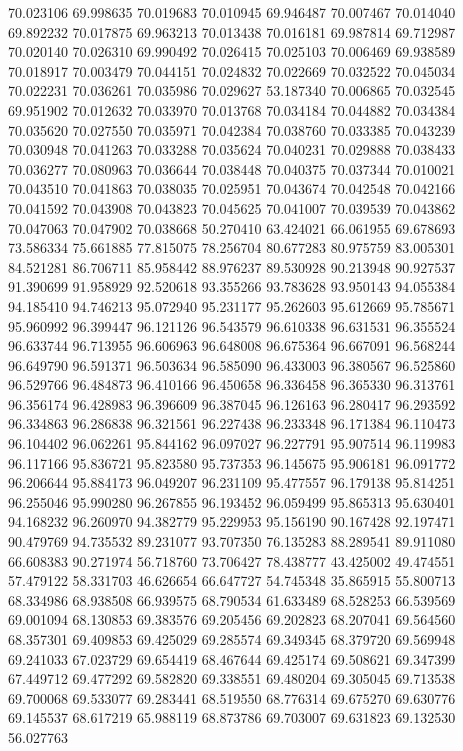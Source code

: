 70.023106
69.998635
70.019683
70.010945
69.946487
70.007467
70.014040
69.892232
70.017875
69.963213
70.013438
70.016181
69.987814
69.712987
70.020140
70.026310
69.990492
70.026415
70.025103
70.006469
69.938589
70.018917
70.003479
70.044151
70.024832
70.022669
70.032522
70.045034
70.022231
70.036261
70.035986
70.029627
53.187340
70.006865
70.032545
69.951902
70.012632
70.033970
70.013768
70.034184
70.044882
70.034384
70.035620
70.027550
70.035971
70.042384
70.038760
70.033385
70.043239
70.030948
70.041263
70.033288
70.035624
70.040231
70.029888
70.038433
70.036277
70.080963
70.036644
70.038448
70.040375
70.037344
70.010021
70.043510
70.041863
70.038035
70.025951
70.043674
70.042548
70.042166
70.041592
70.043908
70.043823
70.045625
70.041007
70.039539
70.043862
70.047063
70.047902
70.038668
50.270410
63.424021
66.061955
69.678693
73.586334
75.661885
77.815075
78.256704
80.677283
80.975759
83.005301
84.521281
86.706711
85.958442
88.976237
89.530928
90.213948
90.927537
91.390699
91.958929
92.520618
93.355266
93.783628
93.950143
94.055384
94.185410
94.746213
95.072940
95.231177
95.262603
95.612669
95.785671
95.960992
96.399447
96.121126
96.543579
96.610338
96.631531
96.355524
96.633744
96.713955
96.606963
96.648008
96.675364
96.667091
96.568244
96.649790
96.591371
96.503634
96.585090
96.433003
96.380567
96.525860
96.529766
96.484873
96.410166
96.450658
96.336458
96.365330
96.313761
96.356174
96.428983
96.396609
96.387045
96.126163
96.280417
96.293592
96.334863
96.286838
96.321561
96.227438
96.233348
96.171384
96.110473
96.104402
96.062261
95.844162
96.097027
96.227791
95.907514
96.119983
96.117166
95.836721
95.823580
95.737353
96.145675
95.906181
96.091772
96.206644
95.884173
96.049207
96.231109
95.477557
96.179138
95.814251
96.255046
95.990280
96.267855
96.193452
96.059499
95.865313
95.630401
94.168232
96.260970
94.382779
95.229953
95.156190
90.167428
92.197471
90.479769
94.735532
89.231077
93.707350
76.135283
88.289541
89.911080
66.608383
90.271974
56.718760
73.706427
78.438777
43.425002
49.474551
57.479122
58.331703
46.626654
66.647727
54.745348
35.865915
55.800713
68.334986
68.938508
66.939575
68.790534
61.633489
68.528253
66.539569
69.001094
68.130853
69.383576
69.205456
69.202823
68.207041
69.564560
68.357301
69.409853
69.425029
69.285574
69.349345
68.379720
69.569948
69.241033
67.023729
69.654419
68.467644
69.425174
69.508621
69.347399
67.449712
69.477292
69.582820
69.338551
69.480204
69.305045
69.713538
69.700068
69.533077
69.283441
68.519550
68.776314
69.675270
69.630776
69.145537
68.617219
65.988119
68.873786
69.703007
69.631823
69.132530
56.027763
